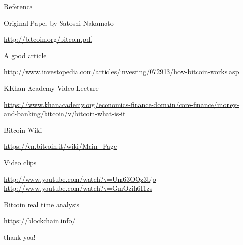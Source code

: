 \documentclass{beamer}
\begin{document}
\begin{frame}
Reference 
\begin{thebibliography}{99}

Original Paper by Satoshi Nakamoto\\ \begin{tiny}
  \url{http://bitcoin.org/bitcoin.pdf}
\end{tiny}

A good article\\ \begin{tiny}
 \url{http://www.investopedia.com/articles/investing/072913/how-bitcoin-works.asp}
\end{tiny}

\bibitem KKhan Academy Video Lecture\\ \begin{tiny}
  \url{https://www.khanacademy.org/economics-finance-domain/core-finance/money-and-banking/bitcoin/v/bitcoin-what-is-it}
\end{tiny}


Bitcoin Wiki\\ \begin{tiny}
 \url{https://en.bitcoin.it/wiki/Main_Page}
\end{tiny}


Video clips\\ \begin{tiny}
 \url {http://www.youtube.com/watch?v=Um63OQz3bjo}\linebreak
 \url {http://www.youtube.com/watch?v=GmOzih6I1zs}
\end{tiny}
Bitcoin real time analysis\\ \begin{tiny}
 \url {https://blockchain.info/}
\end{tiny}
\end{thebibliography}
\end{frame}




\begin{frame}
\begin{center}
\begin{huge}
thank you!
\end{huge}
\end{center}
\end{frame}
\end{document}
